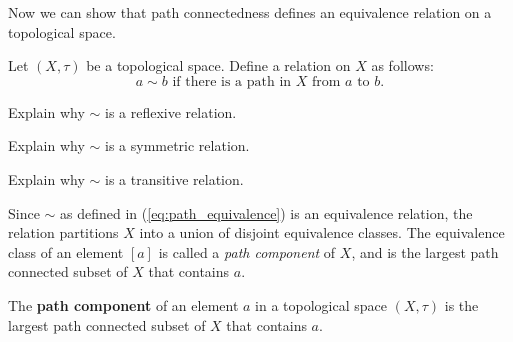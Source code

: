 Now we can show that path connectedness defines an equivalence relation on a topological space. 

\begin{activity} Let $(X,\tau)$ be a topological space. Define a relation on $X$ as follows:
\begin{equation} \label{eq:path_equivalence}
a \sim b \text{ if there is a path in } X \text{ from } a \text{ to } b. 
\end{equation}
\ba
\item Explain why $\sim$ is a reflexive relation.

\item Explain why $\sim$ is a symmetric relation.

\item Explain why $\sim$ is a transitive relation.

\ea

\end{activity}

\begin{comment}

\ActivitySolution

\ba
\item Let $a \in X$. The constant function $p : [0,1] \to X$ defined by $p(x) = a$ for all $x in X$ is a path from $a$ to $a$. So $a \sim a$ and $\sim$ is a reflexive relation.

\item Let $b \in X$ such that $a \sim b$. Then there is a path $p:[0,1] \to X$ from $a$ to $b$. The function $q : [0,1] \to X$ defined by $q(x) = p(1-x)$ is a path from $b$ to $a$. So $b \sim a$ and $\sim$ is symmetric.

\item Assume $a \sim b$ and let $c \in X$ such that $b \sim c$. So there is a path $p$ from $a$ to $b$ and a path $q$ from $b$ to $c$. The path product $q*p$ is a path from $a$ to $c$, which makes $a \sim c$. We conclude that $\sim$ is transitive and an equivalence relation.

\ea

\end{comment}
 
Since $\sim$ as defined in (\ref{eq:path_equivalence}) is an equivalence relation, the relation partitions $X$ into a union of disjoint equivalence classes. The equivalence class of an element $[a]$ is called a \emph{path component} of $X$, and is the largest path connected subset of $X$ that contains $a$. 

\begin{definition} The \textbf{path component} of an element $a$ in a topological space $(X, \tau)$ is the largest path connected subset of $X$ that contains $a$. 
\end{definition}
 
